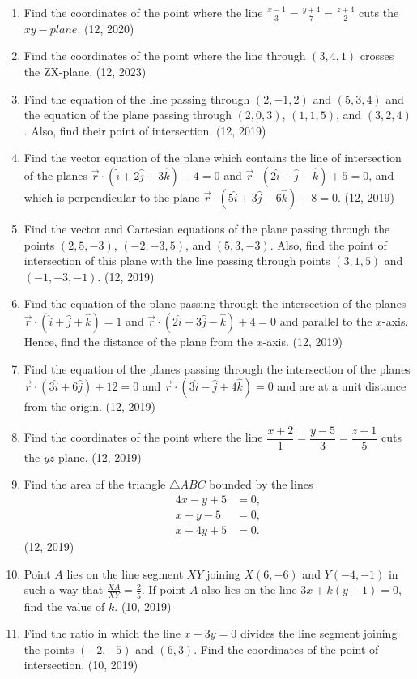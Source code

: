 \begin{enumerate}[label=\thesubsection.\arabic*, ref=\thesubsection.\theenumi]
\item Find the coordinates of the point where the line $\frac{x-1}{3} = \frac{y+4}{7} = \frac{z+4}{2}$ cuts the $xy-plane$.
\hfill (12, 2020)
    \item Find the coordinates of the point where the line through $(3, 4, 1)$ crosses the ZX-plane.
    \hfill (12, 2023)
	\item Find the equation of the line passing through $(2, -1, 2)$ and $(5, 3, 4)$ and the equation of the plane passing through $(2, 0, 3)$, $(1, 1, 5)$, and $(3, 2, 4)$. Also, find their point of intersection. \hfill (12, 2019)
	
	\item Find the vector equation of the plane which contains the line of intersection of the planes $\overrightarrow{r} \cdot (\hat{i} + 2\hat{j} + 3\hat{k}) - 4 = 0$ and $\overrightarrow{r} \cdot (2\hat{i} + \hat{j} - \hat{k}) + 5 = 0$, and which is perpendicular to the plane $\overrightarrow{r} \cdot (5\hat{i} + 3\hat{j} - 6\hat{k}) + 8 = 0$. \hfill (12, 2019)
	\item Find the vector and Cartesian equations of the plane passing through the points $(2, 5, -3)$, $(-2, -3, 5)$, and $(5, 3, -3)$. Also, find the point of intersection of this plane with the line passing through points $(3, 1, 5)$ and $(-1, -3, -1)$. \hfill (12, 2019)
	\item Find the equation of the plane passing through the intersection of the planes $\overrightarrow{r} \cdot (\hat{i} + \hat{j} + \hat{k}) = 1$ and $\overrightarrow{r} \cdot (2\hat{i} + 3\hat{j} - \hat{k}) + 4 = 0$ and parallel to the $x$-axis. Hence, find the distance of the plane from the $x$-axis. \hfill (12, 2019)
	\item Find the equation of the planes passing through the intersection of the planes $\overrightarrow{r} \cdot (3\hat{i} + 6\hat{j}) + 12 = 0$ and $\overrightarrow{r} \cdot (3\hat{i} - \hat{j} + 4\hat{k}) = 0$ and are at a unit distance from the origin. \hfill (12, 2019)
	\item Find the coordinates of the point where the line $\dfrac{x+2}{1} = \dfrac{y-5}{3} = \dfrac{z+1}{5}$ cuts the $yz$-plane. \hfill (12, 2019)
	\item Find the area of the triangle $\triangle ABC$ bounded by the lines
	\begin{align*}
	4x - y + 5 &= 0, \\
	x + y - 5 &= 0, \\
	x - 4y + 5 &= 0.
	\end{align*} \hfill (12, 2019)
\item Point $A$ lies on the line segment $XY$ joining $X(6, -6)$ and $Y(-4, -1)$ in such a way that $\frac{XA}{XY} = \frac{2}{5}$. If point $A$ also lies on the line $3x + k(y + 1) = 0$, find the value of $k$. \hfill (10, 2019)
\item Find the ratio in which the line $x - 3y = 0$ divides the line segment joining the points $(-2, -5)$ and $(6, 3)$. Find the coordinates of the point of intersection. \hfill (10, 2019)
	
\end{enumerate}
